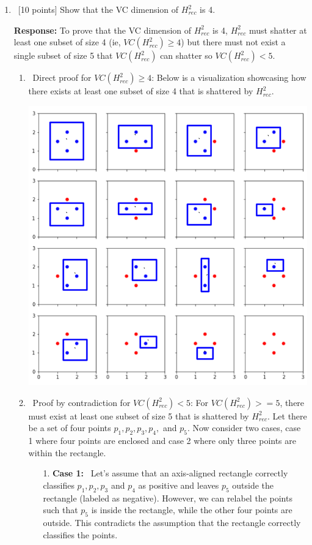 \begin{enumerate}
  \begin{enumerate}
  \item ~[10 points] Show that the VC dimension of $H^2_{rec}$ is 4.
  
  \textbf{Response:} To prove that the VC dimension of $H^2_{rec}$ is 4, $H^2_{rec}$ must shatter at least one subset of size 4 (ie, $VC(H^2_{rec}) \geq 4$) but there must not exist a single subset of size 5 that $VC(H^2_{rec})$ can shatter so $VC(H^2_{rec}) < 5$.
  \begin{enumerate}
  	\item ~Direct proof for $VC(H^2_{rec}) \geq 4$:
  	Below is a visualization showcasing how there exists at least one subset of size 4 that is shattered by $H^2_{rec}$.
  	
  	\includegraphics[scale=0.5]{./img/part3_2a1.png}
  	
  	\item ~Proof by contradiction for $VC(H^2_{rec}) < 5$:
  	For $VC(H^2_{rec}) >= 5$, there must exist at least one subset of size 5 that is shattered by $H^2_{rec}$. Let there be a set of four points $p_1, p_2, p_3, p_4,$ and $p_5$. Now consider two cases, case 1 where four points are enclosed and case 2 where only three points are within the rectangle.
  	\begin{enumerate}
  		\item[1.]{\textbf{Case 1:}} ~Let's assume that an axis-aligned rectangle correctly classifies $p_1, p_2, p_3$ and $p_4$ as positive and leaves $p_5$ outside the rectangle (labeled as negative). However, we can relabel the points such that 
  		$p_5$ is inside the rectangle, while the other four points are outside. This contradicts the assumption that the rectangle correctly classifies the points.
  		

\end{enumerate}
\end{enumerate}
\end{enumerate}
\end{enumerate}
